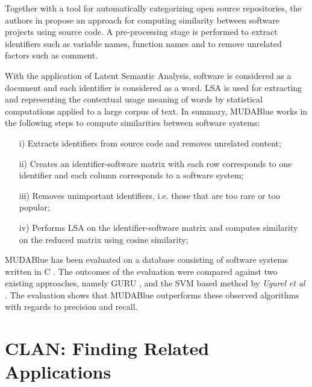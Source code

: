 Together with a tool for automatically categorizing open source repositories, the authors in \cite{10.1109/APSEC.2004.69} propose an approach for computing similarity between software projects using source code. A pre-processing stage is performed to extract identifiers such as variable names, function names and to remove unrelated factors such as comment.

With the application of Latent Semantic Analysis, software is considered as a document and each identifier is considered as a word. LSA is used for extracting and representing the contextual usage meaning of words by statistical computations applied to a large corpus of text. In summary, MUDABlue works in the following steps to compute similarities between software systems:

\begin{itemize}
	
	\item[i)] Extracts identifiers from source code and removes unrelated content;
	\item[ii)] Creates an identifier-software matrix with each row corresponds to one identifier and each column corresponds to a software system;%
	\item[iii)] Removes unimportant identifiers, i.e. those that are too rare or too popular;
	\item[iv)] Performs LSA on the identifier-software matrix and computes similarity on the reduced matrix using cosine similarity; 
\end{itemize}

MUDABlue has been evaluated on a database consisting of software systems written in C \cite{10.1109/APSEC.2004.69}. The outcomes of the evaluation were compared against two existing approaches, namely GURU \cite{Maarek:1991:IRA:126244.126254}, and the SVM based method by \emph{Ugurel et al} \cite{Ugurel:2002:WCA:775047.775141}. The evaluation shows that MUDABlue outperforms these observed algorithms with regards to precision and recall.


\section{CLAN: Finding Related Applications}\label{sec:clan}

